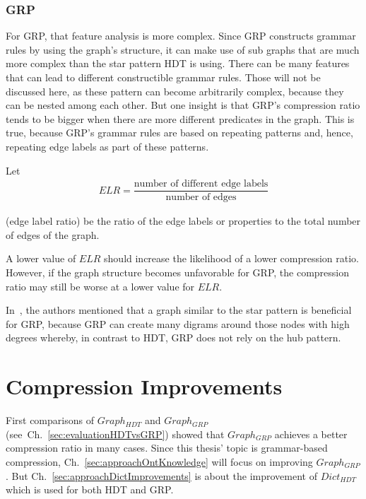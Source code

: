 \subsubsection{GRP}
For GRP, that feature analysis is more complex. Since GRP constructs grammar rules by using the graph's structure, it can make use of sub graphs that are much more complex than the star pattern HDT is using. There can be many features that can lead to different constructible grammar rules. Those will not be discussed here, as these pattern can become arbitrarily complex, because they can be nested among each other. But one insight is that GRP's compression ratio tends to be bigger when there are more different predicates in the graph. This is true, because GRP's grammar rules are based on repeating patterns and, hence, repeating edge labels as part of these patterns.

Let 
\begin{align*}
ELR = \dfrac{\text{number of different edge labels}}{\text{number of edges}} 
\end{align*}

(edge label ratio) be the ratio of the edge labels or properties to the total number of edges of the graph. 

A lower value of $ELR$ should increase the likelihood of a lower compression ratio.  However, if the graph structure becomes unfavorable for GRP, the compression ratio may still be worse at a lower value for $ELR$.

In~\cite{maneth}, the authors mentioned that a graph similar to the star pattern is beneficial for GRP, because GRP can create many digrams around those nodes with high degrees whereby, in contrast to HDT, GRP does not rely on the hub pattern.


\section{Compression Improvements}\label{sec:approachComprRatioImprovements}

First comparisons of $Graph_{HDT}$ and $Graph_{GRP}$ (see~Ch.~\ref{sec:evaluationHDTvsGRP}) showed that  $Graph_{GRP}$ achieves a better compression ratio in many cases. Since this thesis' topic is grammar-based compression, Ch.~\ref{sec:approachOntKnowledge} will focus on improving $Graph_{GRP}$. But Ch.~\ref{sec:approachDictImprovements} is about the improvement of $Dict_{HDT}$ which is used for both HDT and GRP.



